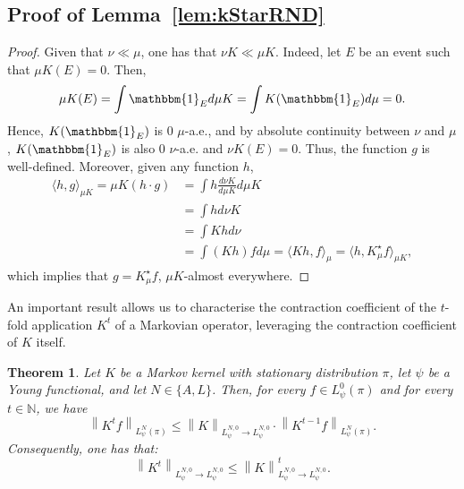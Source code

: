 \documentclass[11pt]{article}
\theoremstyle{plain}
\newtheorem{theorem}{Theorem}[section]
\theoremstyle{remark}
\begin{document}
\subsection{Proof of Lemma~\ref{lem:kStarRND}}\label{app:kStarRND}
 \begin{proof}
    Given that $\nu\ll\mu$, one has that $\nu K\ll \mu K$. %
    Indeed, let $E$ be an event such that $\mu K(E)=0$. Then, %
    \begin{equation}
        \mu K(E) = \int \mathbbm{1}_E d\mu K = \int K(\mathbbm{1}_E) d\mu = 0 .
    \end{equation} Hence, $K(\mathbbm{1}_E)$ is $0$ $\mu$-a.e., and by absolute continuity between $\nu$ and $\mu$, $K(\mathbbm{1}_E)$ is also $0$ $\nu$-a.e. and $\nu K(E)=0$. Thus, the function $g$ is well-defined. Moreover, given any function $h$,
    \begin{align}
        \langle h, g \rangle_{\mu K} = \mu K( h\cdot g) &=  \int h \frac{d\nu K}{d\mu K} d\mu K\\ &=\int h d\nu K \\ &= \int Kh d\nu \\
        &= \int (Kh)f d\mu =  \langle Kh,f \rangle_{\mu} = \langle h,K^\star_\mu f \rangle_{\mu K}, 
    \end{align}
    which implies that $g=K^\star_\mu f$, $\mu K$-almost everywhere.
    \end{proof}
    An important result allows us to characterise the contraction coefficient of the  $t$-fold application $K^t$ of a Markovian operator, leveraging the contraction coefficient of $K$ itself.
\begin{theorem}\label{thm:recursionOperatorNorm}
    Let $K$ be a Markov kernel with stationary distribution $\pi$, let $\psi$ be a Young functional, and let $N\in\{A,L\}$. Then, for every $f \in L_\psi^0(\pi)$ and for every $t\in\mathbb N$, we have %
    \begin{equation}
        \left\lVert K^t f\right\rVert_{L_\psi^N(\pi)} \leq \left\lVert K\right\rVert_{L_\psi^{N,0}\to L_\psi^{N,0}} \cdot  \left\lVert K^{t-1} f\right\rVert_{L_\psi^N(\pi)}.
    \end{equation}
    Consequently, one has that:
    \begin{equation}
        \left\lVert K^t \right\rVert_{L_\psi^{N,0}\to L_\psi^{N,0}} \leq \left\lVert K\right\rVert_{L_\psi^{N,0}\to L_\psi^{N,0}}^t.
    \end{equation}
\end{theorem}
\end{document}
